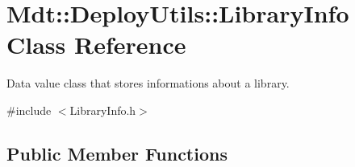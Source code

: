 \hypertarget{class_mdt_1_1_deploy_utils_1_1_library_info}{}\section{Mdt\+:\+:Deploy\+Utils\+:\+:Library\+Info Class Reference}
\label{class_mdt_1_1_deploy_utils_1_1_library_info}


Data value class that stores informations about a library.  




{\ttfamily \#include $<$Library\+Info.\+h$>$}

\subsection*{Public Member Functions}
